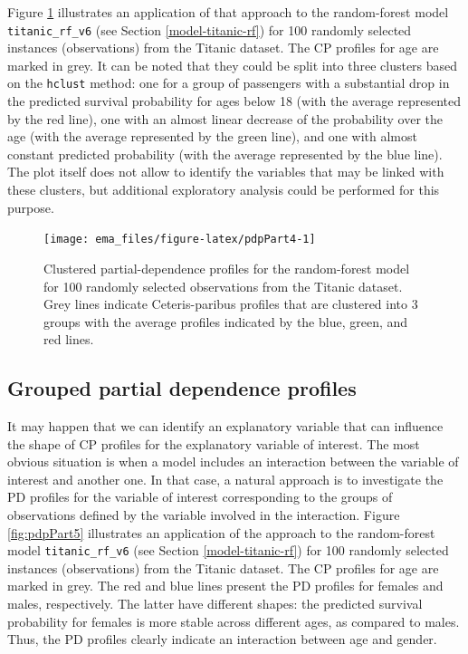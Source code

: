 \documentclass[]{krantz}
\begin{document}
Figure \ref{fig:pdpPart4} illustrates an application of that approach to the random-forest model \texttt{titanic\_rf\_v6} (see Section \ref{model-titanic-rf}) for 100 randomly selected instances (observations) from the Titanic dataset. The CP profiles for age are marked in grey. It can be noted that they could be split into three clusters based on the \texttt{hclust} method: one for a group of passengers with a substantial drop in the predicted survival probability for ages below 18 (with the average represented by the red line), one with an almost linear decrease of the probability over the age (with the average represented by the green line), and one with almost constant predicted probability (with the average represented by the blue line). The plot itself does not allow to identify the variables that may be linked with these clusters, but additional exploratory analysis could be performed for this purpose.

\begin{figure}

{\centering \texttt{[image: ema\_files/figure-latex/pdpPart4-1]} 

}

\caption{Clustered partial-dependence profiles for the random-forest model for 100 randomly selected observations from the Titanic dataset. Grey lines indicate Ceteris-paribus profiles that are clustered into 3 groups with the average profiles indicated by the blue, green, and red lines.}\label{fig:pdpPart4}
\end{figure}

\hypertarget{groupedPDPs}{%
\subsection{Grouped partial dependence profiles}\label{groupedPDPs}}

It may happen that we can identify an explanatory variable that can influence the shape of CP profiles for the explanatory variable of interest. The most obvious situation is when a model includes an interaction between the variable of interest and another one. In that case, a natural approach is to investigate the PD profiles for the variable of interest corresponding to the groups of observations defined by the variable involved in the interaction.
Figure \ref{fig:pdpPart5} illustrates an application of the approach to the random-forest model \texttt{titanic\_rf\_v6} (see Section \ref{model-titanic-rf}) for 100 randomly selected instances (observations) from the Titanic dataset. The CP profiles for age are marked in grey. The red and blue lines present the PD profiles for females and males, respectively. The latter have different shapes: the predicted survival probability for females is more stable across different ages, as compared to males. Thus, the PD profiles clearly indicate an interaction between age and gender.
\end{document}
